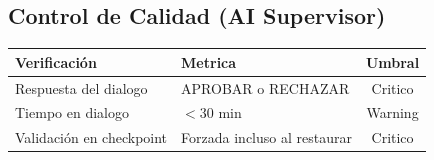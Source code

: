 \documentclass[12pt,a4paper]{article}
\begin{document}
\begin{tcolorbox}[aiSupervisor]
\subsection*{Control de Calidad (AI Supervisor)}

\begin{table}[H]
\centering
\begin{tabular}{llc}
\toprule
\textbf{Verificación} & \textbf{Metrica} & \textbf{Umbral} \\
\midrule
Respuesta del dialogo & APROBAR o RECHAZAR & Critico \\
Tiempo en dialogo & $< 30$ min & Warning \\
Validación en checkpoint & Forzada incluso al restaurar & Critico \\
\bottomrule
\end{tabular}
\end{table}

\newpage


\newpage


\newpage


\newpage


\newpage


\newpage


\newpage


\newpage

\end{tcolorbox}
\end{document}
